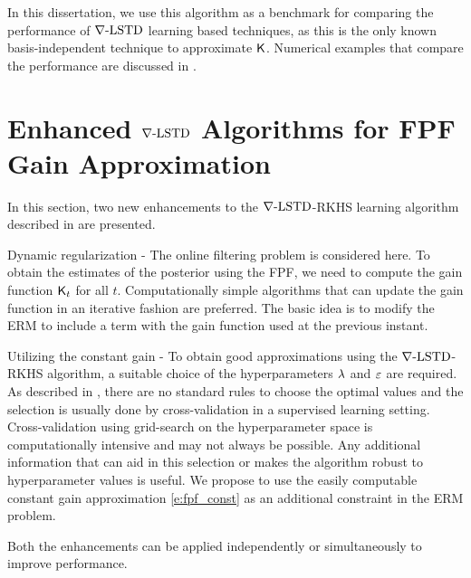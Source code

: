 In this dissertation, we use this algorithm as a benchmark for comparing the performance of $\nabla\text{-LSTD}$ learning based techniques, as this is the only known basis-independent technique to approximate $\text{\sf K}$. Numerical examples that compare the performance are discussed in .

\section{Enhanced $\nabla\text{-LSTD}$ Algorithms for FPF Gain Approximation} 
\label{s:fpf_rkhs_improvements}
In this section, two new enhancements to the $\nabla\text{-LSTD}$-RKHS learning algorithm described in  are presented. 
\begin{romannum}
\item Dynamic regularization - The online filtering problem is considered here. To obtain the estimates of the posterior using the FPF, we need to compute the gain function $\text{\sf K}_t$ for all $t$. Computationally simple algorithms that can update the gain function in an iterative fashion are preferred. The basic idea is to modify the ERM to include a term with the gain function used at the previous instant.
\item Utilizing the constant gain - To obtain good approximations using the $\nabla\text{-LSTD}$-RKHS algorithm, a suitable choice of the hyperparameters $\lambda$ and $\varepsilon$ are required. As described in , there are no standard rules to choose the optimal values and the selection is usually done by cross-validation in a supervised learning setting. Cross-validation using grid-search on the hyperparameter space is computationally intensive and may not always be possible. Any additional information that can aid in this selection or makes the algorithm robust to hyperparameter values is useful. We propose to use the easily computable constant gain approximation \eqref{e:fpf_const} as an additional constraint in the ERM problem. 
\end{romannum}
Both the enhancements can be applied independently or simultaneously to improve performance. 


